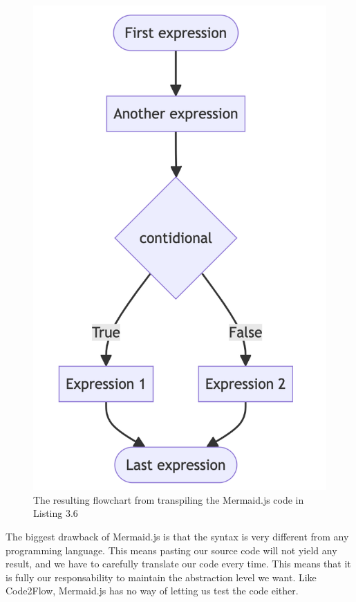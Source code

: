 \begin{figure}[ht]
    \centering
    \includegraphics[scale=.5]{assets/mermaidjs.png}
    \caption{The resulting flowchart from transpiling the Mermaid.js code in Listing 3.6}
    \label{fig:code2flow}
\end{figure}

The biggest drawback of Mermaid.js is that the syntax is very different from any programming language. This means pasting our source code will not yield any result, and we have to carefully translate our code every time. This means that it is fully our responsability to maintain the abstraction level we want. Like Code2Flow, Mermaid.js has no way of letting us test the code either.